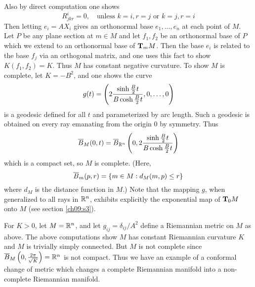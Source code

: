 \documentclass[../main]{subfiles}
\begin{document}
Also by direct computation one shows
\[R_{jkr}^i=0,
\quad \text{unless $k=i,r=j$ or $k=j,r=i$}\]
Then letting $e_i=AX_i$ gives an orthonormal base $e_1,\ldots,e_n$ at each point of $M$. Let $P$ be any plane section at $m\in M$ and let $f_1,f_2$ be an orthonormal base of $P$ which we extend to an orthonormal base of $\ts Mm$. Then the base $e_i$ is related to the base $f_j$ via an orthogonal matrix, and one uses this fact to show $K(f_1,f_2)=K$. Thus $M$ has constant negative curvature. To show $M$ is complete, let $K=-B^2$, and one shows the curve
\[g(t) = \br{2\frac{\sinh\frac B2t}{B\cosh\frac B2t},0,\ldots,0}\]
is a geodesic defined for all $t$ and parameterized by arc length. Such a geodesic is obtained on every ray emanating from the origin 0 by symmetry. Thus
\[\bar B_M(0,t) = \bar B_{\bR^n}\br{0,2\frac{\sinh\frac B2t}{B\cosh\frac B2t}}\]
which is a compact set, so $M$ is complete. (Here,
\[\bar B_m(p,r)=\brc{m\in M: d_M(m,p)\le r}\]
where $d_M$ is the distance function in $M$.) Note that the mapping $g$, when generalized to all rays in $\bR^n$, exhibits explicitly the exponential map of $\ts M0$ onto $M$ (see section \ref{ch09:s3}).

For $K>0$, let $M=\bR^n$, and let $g_{ij}=\delta_{ij}/A^2$ define a Riemannian metric on $M$ as above. The above computations show $M$ has constant Riemannian curvature $K$ and $M$ is trivially simply connected. But $M$ is not complete since $\bar B_M\br{0,\frac{2\pi}{\sqrt K}}=\bR^n$ is not compact. Thus we have an example of a conformal change of metric which changes a complete Riemannian manifold into a non-complete Riemannian manifold.
\end{document}
